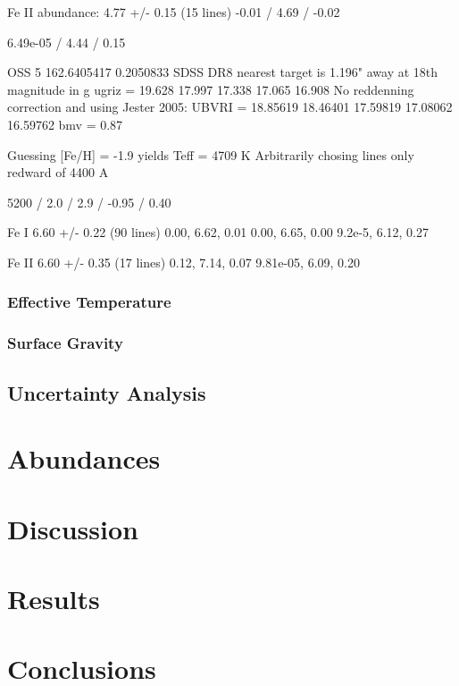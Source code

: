 \documentclass{emulateapj}
\begin{document}
Fe II abundance: 4.77 +/- 0.15 (15 lines)
-0.01 / 4.69 / -0.02

6.49e-05 / 4.44 / 0.15

OSS 5
162.6405417 0.2050833
SDSS DR8 nearest target is 1.196" away at 18th magnitude in g
ugriz = 19.628 17.997 17.338 17.065 16.908
No reddenning correction and using Jester 2005:
UBVRI = 18.85619 18.46401 17.59819 17.08062 16.59762
bmv = 0.87

Guessing [Fe/H] = -1.9 yields Teff = 4709 K
Arbitrarily chosing lines only redward of 4400 A

5200 / 2.0 / 2.9 / -0.95 / 0.40

Fe I 6.60 +/- 0.22 (90 lines)
0.00, 6.62, 0.01
0.00, 6.65, 0.00
9.2e-5, 6.12, 0.27

Fe II 6.60 +/- 0.35 (17 lines)
0.12, 7.14, 0.07
9.81e-05, 6.09, 0.20

\subsubsection{Effective Temperature}

\subsubsection{Surface Gravity}

\subsection{Uncertainty Analysis}


\section{Abundances}


\section{Discussion}

\section{Results}

\section{Conclusions}
\end{document}
